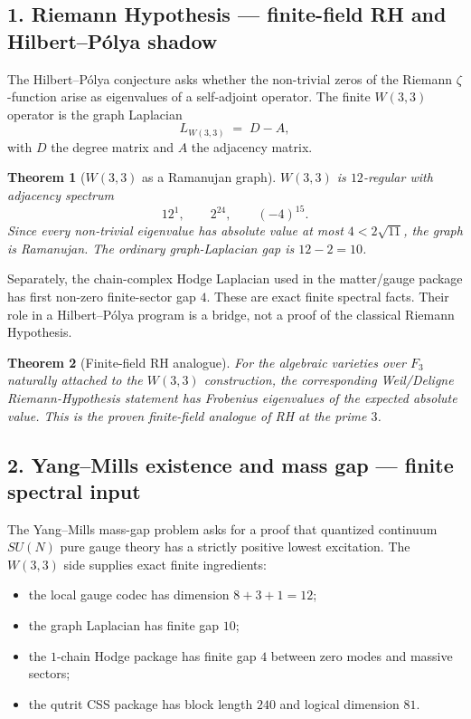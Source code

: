 \documentclass[11pt]{article}
\def\mathbb#1{#1}%
\newtheorem*{theorem}{Theorem}
\begin{document}
\subsection*{1. Riemann Hypothesis --- finite-field RH and Hilbert--Pólya shadow}

The Hilbert--Pólya conjecture asks whether the non-trivial zeros of the Riemann $\zeta$-function arise as eigenvalues of a self-adjoint operator. The finite $W(3,3)$ operator is the graph Laplacian
\[
L_{W(3,3)} \;=\; D - A,
\]
with $D$ the degree matrix and $A$ the adjacency matrix.

\begin{theorem}[$W(3,3)$ as a Ramanujan graph]
$W(3,3)$ is $12$-regular with adjacency spectrum
\[
12^1,\qquad 2^{24},\qquad (-4)^{15}.
\]
Since every non-trivial eigenvalue has absolute value at most $4 < 2\sqrt{11}$, the graph is Ramanujan. The ordinary graph-Laplacian gap is $12-2=10$.
\end{theorem}

Separately, the chain-complex Hodge Laplacian used in the matter/gauge package has first non-zero finite-sector gap $4$. These are exact finite spectral facts. Their role in a Hilbert--Pólya program is a bridge, not a proof of the classical Riemann Hypothesis.

\begin{theorem}[Finite-field RH analogue]
For the algebraic varieties over $\mathbb{F}_3$ naturally attached to the $W(3,3)$ construction, the corresponding Weil/Deligne Riemann-Hypothesis statement has Frobenius eigenvalues of the expected absolute value. This is the proven finite-field analogue of RH at the prime $3$.
\end{theorem}

\subsection*{2. Yang--Mills existence and mass gap --- finite spectral input}

The Yang--Mills mass-gap problem asks for a proof that quantized continuum $SU(N)$ pure gauge theory has a strictly positive lowest excitation. The $W(3,3)$ side supplies exact finite ingredients:

\begin{itemize}[leftmargin=2em]
\item the local gauge codec has dimension $8+3+1=12$;
\item the graph Laplacian has finite gap $10$;
\item the $1$-chain Hodge package has finite gap $4$ between zero modes and massive sectors;
\item the qutrit CSS package has block length $240$ and logical dimension $81$.
\end{itemize}
\end{document}
